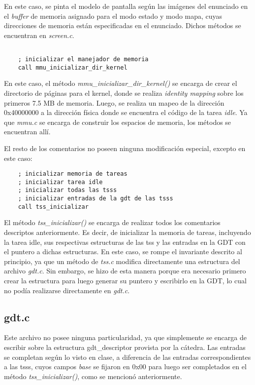 \documentclass[a4paper]{article}
\newenvironment{codesnippet}{%
	\begin{Sbox}\begin{minipage}{\textwidth}\sffamily\small}%
	{\end{minipage}\end{Sbox}%
		\begin{center}%
		\vspace{-0.4cm}\colorbox{litegrey}{\TheSbox}\end{center}\vspace{0.3cm}}
\begin{document}
En este caso, se pinta el modelo de pantalla según las imágenes del enunciado en el \textit{buffer} de memoria asignado para el modo estado y modo mapa, cuyas direcciones de memoria están especificadas en el enunciado. Dichos métodos se encuentran en \textit{screen.c}.

\begin{codesnippet}
\begin{verbatim}

    ; inicializar el manejador de memoria
    call mmu_inicializar_dir_kernel

\end{verbatim}
\end{codesnippet}

En este caso, el método \textit{mmu_inicializar_dir_kernel()} se encarga de crear el directorio de páginas para el kernel, donde se realiza \textit{identity mapping} sobre los primeros 7.5 MB de memoria. Luego, se realiza un mapeo de la dirección 0x40000000 a la dirección física donde se encuentra el código de la tarea \textit{idle}. Ya que \textit{mmu.c} se encarga de construir los espacios de memoria, los métodos se encuentran allí.

El resto de los comentarios no poseen ninguna modificación especial, excepto en este caso:
\begin{codesnippet}
\begin{verbatim}
    ; inicializar memoria de tareas
    ; inicializar tarea idle
    ; inicializar todas las tsss
    ; inicializar entradas de la gdt de las tsss
    call tss_inicializar
\end{verbatim}
\end{codesnippet}

El método \textit{tss_inicializar()} se encarga de realizar todos los comentarios descriptos anteriormente. Es decir, de inicializar la memoria de tareas, incluyendo la tarea idle, sus respectivas estructuras de las tss y las entradas en la GDT con el puntero a dichas estructuras. En este caso, se rompe el invariante descrito al principio, ya que un método de \textit{tss.c} modifica directamente una estructura del archivo \textit{gdt.c}. Sin embargo, se hizo de esta manera porque era necesario primero crear la estructura para luego generar su puntero y escribirlo en la GDT, lo cual no podía realizarse directamente en \textit{gdt.c}.

\subsection{gdt.c}
Este archivo no posee ninguna particularidad, ya que simplemente se encarga de escribir sobre la estructura gdt_descriptor provista por la cátedra. Las entradas se completan según lo visto en clase, a diferencia de las entradas correspondientes a las tsss, cuyos campos \textit{base} se fijaron en 0x00 para luego ser completados en el método \textit{tss_inicializar()}, como se mencionó anteriormente.
\end{document}
